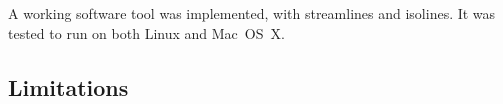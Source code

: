 
A working software tool was implemented, with streamlines and isolines. It was
tested to run on both Linux and Mac~OS~X.

\subsection{Limitations}

